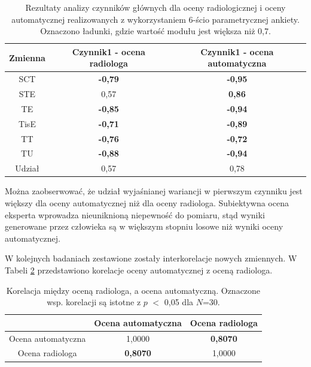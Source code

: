 \begin{table}[h]
	\centering
	\setlength{\tabcolsep}{3pt}
	\setlength\extrarowheight{2pt}
	\caption{Rezultaty analizy czynników głównych dla oceny radiologicznej i oceny automatycznej realizowanych z wykorzystaniem 6-ścio parametrycznej ankiety. Oznaczono ładunki, gdzie wartość modułu jest większa niż 0,7.}
	\label{tab:pca-gt-pred}
	\begin{tabular}{c|c|c}
		Zmienna&Czynnik1 - ocena radiologa&Czynnik1 - ocena automatyczna \\
		\hline \hline
		SCT&\textbf{-0,79}&\textbf{-0,95}\\
		\hline
		STE&0,57&\textbf{0,86}\\
		\hline
		TE&\textbf{-0,85}&\textbf{-0,94}\\
		\hline
		TisE&\textbf{-0,71}&\textbf{-0,89}\\
		\hline
		TT&\textbf{-0,76}&\textbf{-0,72}\\
		\hline
		TU&\textbf{-0,88}&\textbf{-0,94}\\
		\hline \hline	
		Udział&0,57&0,78\\
			
	\end{tabular}
\end{table}

Można zaobserwować, że udział wyjaśnianej wariancji w pierwszym czynniku jest większy dla oceny automatycznej niż dla oceny radiologa. Subiektywna ocena eksperta wprowadza nieuniknioną niepewność do pomiaru, stąd wyniki generowane przez człowieka są w większym stopniu losowe niż wyniki oceny automatycznej. 

W kolejnych badaniach zestawione zostały interkorelacje nowych zmiennych. \linebreak W Tabeli \ref{tab:gtVSpred} przedstawiono korelacje oceny automatycznej z oceną radiologa.

\vspace{10px}
\begin{table}[h]
	\centering
	\setlength{\tabcolsep}{3pt}
	\setlength\extrarowheight{2pt}
	\caption{Korelacja między oceną radiologa, a ocena automatyczną. Oznaczone wsp. korelacji są istotne z $p$ $<$ 0,05 dla $N$=30.}
	\label{tab:gtVSpred}
	\begin{tabular}{c|c|c}
		&Ocena automatyczna &Ocena radiologa \\
		\hline \hline
		Ocena automatyczna&1,0000&\textbf{0,8070}\\
		\hline
		Ocena radiologa&\textbf{0,8070}&1,0000\\
			
	\end{tabular}
\end{table}

